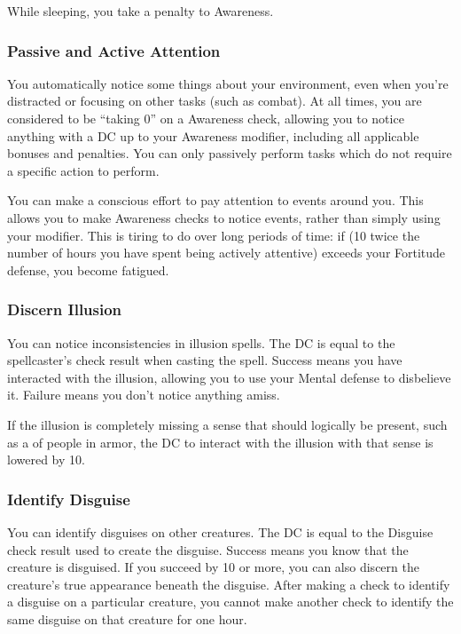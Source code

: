 While sleeping, you take a  penalty to Awareness.

\subsubsection{Passive and Active Attention}\label{Awareness-Passive and Active Attention}
You automatically notice some things about your environment, even when you're distracted or focusing on other tasks (such as combat). At all times, you are considered to be ``taking 0'' on a Awareness check, allowing you to notice anything with a DC up to your Awareness modifier, including all applicable bonuses and penalties. You can only passively perform tasks which do not require a specific action to perform.

You can make a conscious effort to pay attention to events around you. This allows you to make Awareness checks to notice events, rather than simply using your modifier. This is tiring to do over long periods of time: if (10 \add twice the number of hours you have spent being actively attentive) exceeds your Fortitude defense, you become fatigued.

\subsubsection{Discern Illusion}
You can notice inconsistencies in illusion spells. The DC is equal to the spellcaster's check result when casting the spell. Success means you have interacted with the illusion, allowing you to use your Mental defense to disbelieve it. Failure means you don't notice anything amiss.

If the illusion is completely missing a sense that should logically be present, such as a  of people in armor, the DC to interact with the illusion with that sense is lowered by 10.

\subsubsection{Identify Disguise}
You can identify disguises on other creatures. The DC is equal to the Disguise check result used to create the disguise. Success means you know that the creature is disguised. If you succeed by 10 or more, you can also discern the creature's true appearance beneath the disguise. After making a check to identify a disguise on a particular creature, you cannot make another check to identify the same disguise on that creature for one hour.

